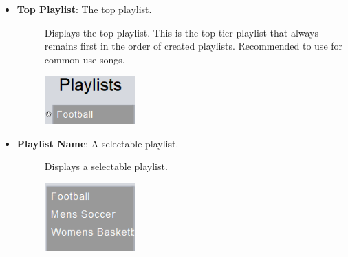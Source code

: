 \documentclass{article}
\begin{document}
\begin{itemize}
    \item \textbf{Top Playlist}: The top playlist.
    \begin{description}
        \item[] Displays the top playlist. This is the top-tier playlist that always remains first in the order of created playlists. Recommended to use for common-use songs.
        \item[] \includegraphics[width=3.5cm]{Images/topPlaylist.png}
    \end{description}
    \item \textbf{Playlist Name}: A selectable playlist.
    \begin{description}
        \item[] Displays a selectable playlist.
        \item[] \includegraphics[width=3.5cm]{Images/Playlist.png}
    \end{description}
    

\end{itemize}
\end{document}

